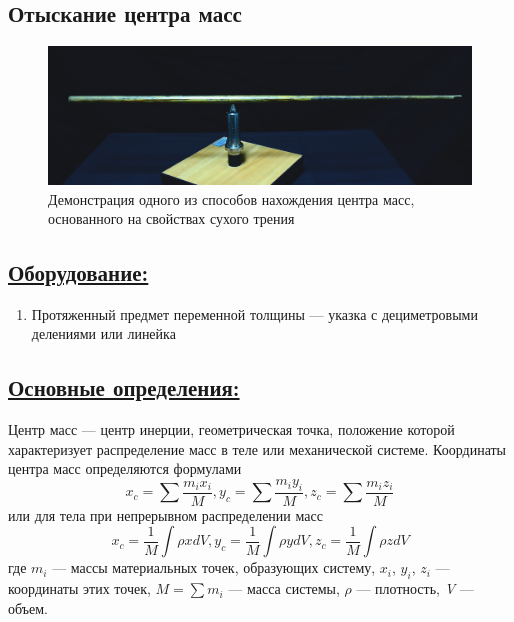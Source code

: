 \documentclass[14pt,a4paper,oneside]{extarticle}	%
\begin{document}
	
	\begin{center}
		\subsection*{Отыскание центра масс}
	\end{center}
	
	\begin{figure}[H] 	
		\centering 	
		\includegraphics[width=0.9\linewidth]{center-1.png}
		\caption{Демонстрация одного из способов нахождения центра масс, основанного на свойствах сухого трения}
		\label{center-1}
	\end{figure}
	
	\subsection*{\underline{Оборудование:}}
	
	\begin{enumerate} 
		\item Протяженный предмет переменной толщины — указка с дециметровыми делениями или линейка
	\end{enumerate}

\subsection*{\underline{Основные определения:}}
	
Центр масс — центр инерции, геометрическая точка, положение которой характеризует распределение масс в теле или механической системе. 
Координаты	центра масс определяются формулами
$$
	x_c =\sum \dfrac{m_i x_i}{M}, y_c =\sum \dfrac{m_i y_i}{M}, z_c =\sum \dfrac{m_i z_i}{M}
$$
	или для тела при непрерывном распределении масс 
$$
	x_c = \dfrac1M \int \rho x dV, y_c =\dfrac1M \int \rho y dV, z_c =\dfrac1M \int \rho z dV
$$
	где $ m_i $ — массы материальных точек, образующих систему, $ x_i $, $ y_i $, $ z_i $ — координаты этих точек, $ M = \sum m_i $ — масса системы, $ \rho $ — плотность, \textit{V} — объем. 
	
\end{document}
